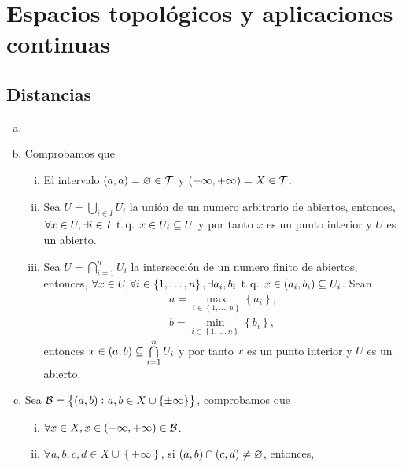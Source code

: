\chapter{Espacios topológicos y aplicaciones continuas}
\section{Distancias}

\begin{eje}
    \begin{enumerate}[(a)]
        \item[]
        \item Comprobamos que
            \begin{enumerate}[i)]
                \item El intervalo $\left( a, a \right) = \varnothing \in \mathcal{T}$ y $\left( -\infty, +\infty \right) = X \in \mathcal{T}$.
                \item Sea $U = \bigcup\limits_{i \in I} U_i$ la unión de un numero arbitrario de abiertos, entonces, $\forall x \in U, \exists i \in I \operatorname{\;t.q.\;} x \in U_i \subseteq U$ y por tanto $x$ es un punto interior y $U$ es un abierto.
                \item Sea $U = \bigcap\limits_{i = 1}^n U_i$ la intersección de un numero finito de abiertos, entonces, $\forall x \in U, \forall i \in \left\{ 1, \dots, n \right\}, \exists a_i, b_i \operatorname{\;t.q.\;} x \in \left(a_i, b_i\right) \subseteq U_i$. Sean
                    \begin{gather*}
                        a = \max_{i \in \left\{ 1, \dots, n \right\}} \left\{a_i\right\}, \\
                        b = \min_{i \in \left\{ 1, \dots, n \right\}} \left\{b_i\right\},
                    \end{gather*}
                entonces $x \in \left( a, b \right) \subseteq \bigcap\limits_{i = 1}^n U_i$ y por tanto $x$ es un punto interior y $U$ es un abierto.
            \end{enumerate}
        \item Sea $\mathcal{B} = \left\{ \left( a, b \right) \colon a, b \in X \cup \left\{ \pm \infty \right\} \right\}$, comprobamos que
            \begin{enumerate}[i)]
                \item $\forall x \in X, x \in \left( -\infty, +\infty \right) \in \mathcal{B}$.
                \item $\forall a, b, c, d \in X \cup \left\{ \pm \infty \right\}$, si $\left( a, b \right) \cap \left( c, d \right) \neq \varnothing$, entonces,

\end{enumerate}
\end{enumerate}
\end{eje}
